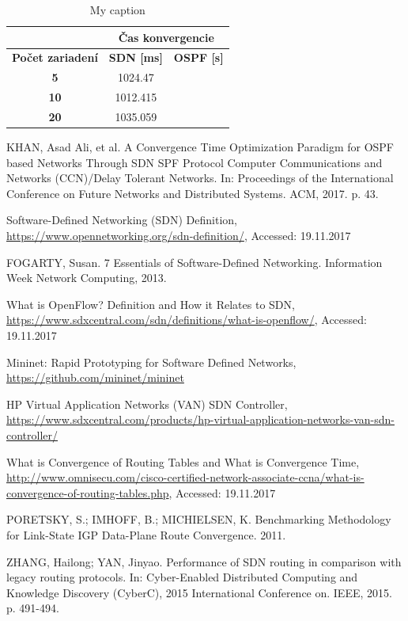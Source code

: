 \documentclass[conference]{IEEEtran}
\begin{document}
\begin{table}[h!]
\centering
\caption{My caption}
\label{my-label}
\begin{tabular}{|c|c|c|}
\hline
                         & \multicolumn{2}{c|}{\textbf{Čas konvergencie}} \\ \hline
\textbf{Počet zariadení} & \textbf{SDN {[}ms{]}}  & \textbf{OSPF {[}s{]}} \\ \hline
\textbf{5}               & 1024.47                &                       \\ \hline
\textbf{10}              & 1012.415             &                       \\ \hline
\textbf{20}              & 1035.059               &                       \\ \hline
\end{tabular}
\end{table}





\ifCLASSOPTIONcaptionsoff
  \newpage
\fi


\begin{thebibliography}{1}
KHAN, Asad Ali, et al. A Convergence Time Optimization Paradigm for OSPF based Networks Through SDN SPF Protocol Computer Communications and Networks (CCN)/Delay Tolerant Networks. In: Proceedings of the International Conference on Future Networks and Distributed Systems. ACM, 2017. p. 43.

Software-Defined Networking (SDN) Definition, \url{https://www.opennetworking.org/sdn-definition/}, Accessed: 19.11.2017

FOGARTY, Susan. 7 Essentials of Software-Defined Networking. Information Week Network Computing, 2013.

What is OpenFlow? Definition and How it Relates to SDN, \url{https://www.sdxcentral.com/sdn/definitions/what-is-openflow/},  Accessed: 19.11.2017

Mininet: Rapid Prototyping for Software Defined Networks, \url{https://github.com/mininet/mininet}

HP Virtual Application Networks (VAN) SDN Controller, \url{https://www.sdxcentral.com/products/hp-virtual-application-networks-van-sdn-controller/}

 What is Convergence of Routing Tables and What is Convergence Time, \url{http://www.omnisecu.com/cisco-certified-network-associate-ccna/what-is-convergence-of-routing-tables.php},  Accessed: 19.11.2017

 PORETSKY, S.; IMHOFF, B.; MICHIELSEN, K. Benchmarking Methodology for Link-State IGP Data-Plane Route Convergence. 2011.

 ZHANG, Hailong; YAN, Jinyao. Performance of SDN routing in comparison with legacy routing protocols. In: Cyber-Enabled Distributed Computing and Knowledge Discovery (CyberC), 2015 International Conference on. IEEE, 2015. p. 491-494.

\end{thebibliography}
\end{document}
